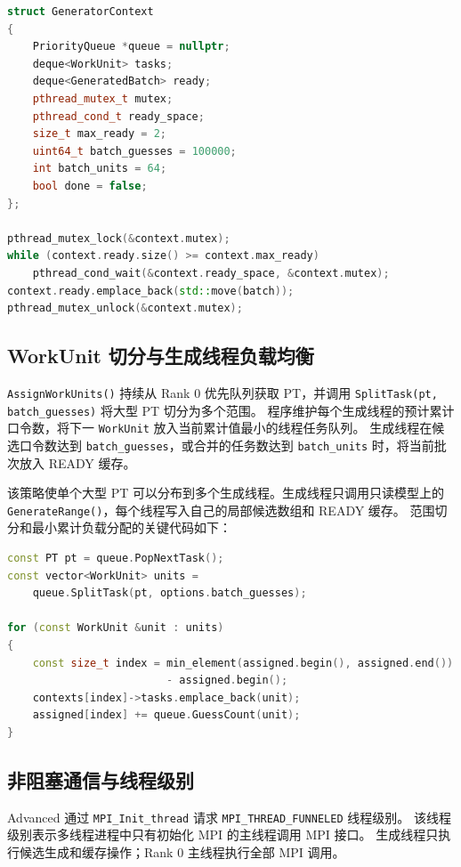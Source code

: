 \documentclass[UTF8,a4paper,12pt]{ctexart}
\newcommand{\code}[1]{\texttt{#1}}
\begin{document}
\begin{lstlisting}[language=C++]
struct GeneratorContext
{
    PriorityQueue *queue = nullptr;
    deque<WorkUnit> tasks;
    deque<GeneratedBatch> ready;
    pthread_mutex_t mutex;
    pthread_cond_t ready_space;
    size_t max_ready = 2;
    uint64_t batch_guesses = 100000;
    int batch_units = 64;
    bool done = false;
};

pthread_mutex_lock(&context.mutex);
while (context.ready.size() >= context.max_ready)
    pthread_cond_wait(&context.ready_space, &context.mutex);
context.ready.emplace_back(std::move(batch));
pthread_mutex_unlock(&context.mutex);
\end{lstlisting}

\subsection{WorkUnit 切分与生成线程负载均衡}

\code{AssignWorkUnits()} 持续从 Rank 0 优先队列获取 PT，并调用
\code{SplitTask(pt, batch\_guesses)} 将大型 PT 切分为多个范围。
程序维护每个生成线程的预计累计口令数，将下一 \code{WorkUnit} 放入当前累计值最小的线程任务队列。
生成线程在候选口令数达到 \code{batch\_guesses}，或合并的任务数达到
\code{batch\_units} 时，将当前批次放入 READY 缓存。

该策略使单个大型 PT 可以分布到多个生成线程。生成线程只调用只读模型上的
\code{GenerateRange()}，每个线程写入自己的局部候选数组和 READY 缓存。
范围切分和最小累计负载分配的关键代码如下：

\begin{lstlisting}[language=C++]
const PT pt = queue.PopNextTask();
const vector<WorkUnit> units =
    queue.SplitTask(pt, options.batch_guesses);

for (const WorkUnit &unit : units)
{
    const size_t index = min_element(assigned.begin(), assigned.end())
                         - assigned.begin();
    contexts[index]->tasks.emplace_back(unit);
    assigned[index] += queue.GuessCount(unit);
}
\end{lstlisting}

\subsection{非阻塞通信与线程级别}

Advanced 通过 \code{MPI\_Init\_thread} 请求
\code{MPI\_THREAD\_FUNNELED} 线程级别。
该线程级别表示多线程进程中只有初始化 MPI 的主线程调用 MPI 接口。
生成线程只执行候选生成和缓存操作；Rank 0 主线程执行全部 MPI 调用。
\end{document}
